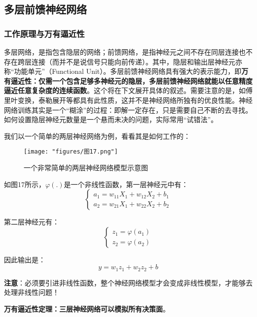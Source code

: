 \subsection{多层前馈神经网络}
\subsubsection{工作原理与万有逼近性}
多层网络，是指包含隐层的网络；前馈网络，是指神经元之间不存在同层连接也不存在跨层连接（而并不是说信号只能向前传递）。其中，隐层和输出层神经元亦称“功能单元”（Functional Unit）。多层前馈神经网络具有强大的表示能力，即\textbf{万有逼近性：仅需一个包含足够多神经元的隐层，多层前馈神经网络就能以任意精度逼近任意复杂度的连续函数}。这个将在下文展开具体的叙述。需要注意的是，如傅里叶变换，泰勒展开等都具有此性质，这并不是神经网络所独有的优良性能。神经网络训练其实是一个“糊涂”的过程：即解一定存在，只是需要自己不断的去寻找。如何设置隐层神经元数量是一个悬而未决的问题，实际常用“试错法”。

我们以一个简单的两层神经网络为例，看看其是如何工作的：
\begin{figure}[ht] %
	\centering
	\texttt{[image: "figures/图17.png"]} %
	\caption{一个非常简单的两层神经网络模型示意图} %
	\label{fig:example} %
\end{figure}

如图17所示，$\varphi(.)$是一个非线性函数，第一层神经元中有：
\begin{equation}\begin{cases}a_1=w_{11}X_1+w_{12}X_2+b_1\\a_2=w_{21}X_1+w_{22}X_2+b_2\end{cases}\end{equation}

第二层神经元有：
\begin{equation}\begin{cases}z_1=\varphi(a_1)\\z_2=\varphi(a_2)\end{cases}\end{equation}

因此输出是：
\begin{equation}y=w_1z_1+w_2z_2+b\end{equation}

\textbf{注意}：必须要引进非线性函数，整个神经网络模型才会变成非线性模型，才能够去处理非线性问题！

\textbf{万有逼近性定理：三层神经网络可以模拟所有决策面}。

